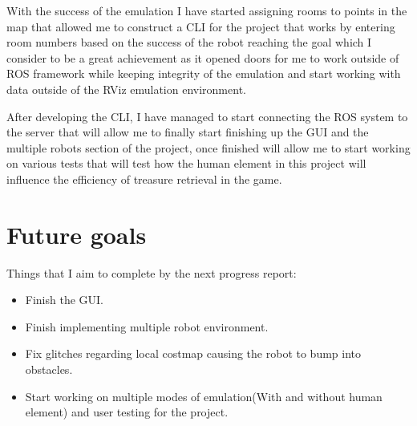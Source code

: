 \documentclass{report}
\begin{document}
	With the success of the emulation I have started assigning rooms to points in the map that allowed me to construct a CLI for the project that works by entering room numbers based on the success of the robot reaching the goal which I consider to be a great achievement as it opened doors for me to work outside of ROS framework while keeping integrity of the emulation and start working with data outside of the RViz emulation environment.

	After developing the CLI, I have managed to start connecting the ROS system to the server that will allow me to finally start finishing up the GUI and the multiple robots section of the project, once finished will allow me to start working on various tests that will test how the human element in this project will influence the efficiency of treasure retrieval in the game.

 	\chapter{Future goals}
 	Things that I aim to complete by the next progress report:

 	\begin{itemize}
  	  \item Finish the GUI.
  	  \item Finish implementing multiple robot environment.
  	  \item Fix glitches regarding local costmap causing the robot to bump into obstacles.
  	  \item Start working on multiple modes of emulation(With and without human element) and user testing for the project.
	\end{itemize}


  
\end{document}
